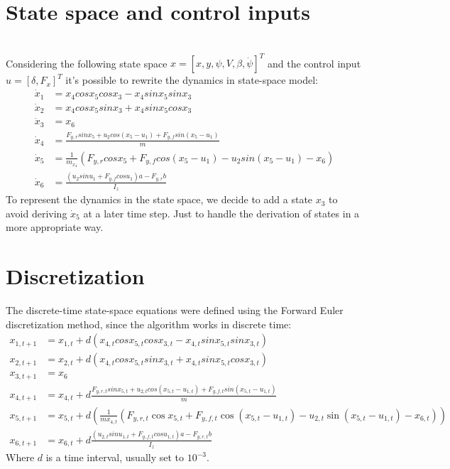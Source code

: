 \documentclass[a4paper,11pt,oneside]{book}
\begin{document}
\section{State space and control inputs}
\\Considering the following state space $x=[x,y,\psi,V,\beta,\dot\psi]^T$ and the control input $u=[\delta,F_x]^T$ it's possible to rewrite the dynamics in state-space model:
\begin{align*}
\dot x_1 &= x_4 cos x_5 cos x_3 - x_4 sin x_5 sin x_3 \\
\dot x_2 &= x_4 cos x_5 sin x_3 + x_4 sin x_5 cos x_3 \\
\dot x_3 &= x_6 \\
\dot x_4 &= \frac{F_{y,r} sin x_5+u_2 cos(x_5 - u_1) + F_{y,f} sin(x_5 - u_1)}{m}\\
\dot x_5 &= \frac{1}{m_x_4} (F_{y,r} cos x_5 + F_{y,f} cos (x_5-u_1)-u_2sin(x_5-u_1)-x_6)\\
\dot x_6&= \frac{(u_2 sin u_1 + F_{y,f} cos u_1) a - F_{y,r} b}{I_z}
\end{align*}
To represent the dynamics in the state space, we decide to add a state $x_3$ to avoid deriving $\dot x_5$
at a later time step.  Just to handle the derivation of states in a more appropriate way.

\section{Discretization}
The discrete-time state-space equations were defined using the Forward Euler discretization method, since the algorithm works in discrete time:
\begin{align*}
    x_{1,t+1} &= x_{1,t} + d(x_{4,t} cos x_{5,t} cos x_{3,t} - x_{4,t} sin x_{5,t} sin x_{3,t})\\
    x_{2,t+1} &= x_{2,t} + d(x_{4,t} cos x_{5,t} sin x_{3,t} + x_{4,t} sin x_{5,t} cos x_{3,t})\\
    x_{3,t+1} &= x_6\\
    x_{4,t+1} &= x_{4,t} + d\frac{F_{y,r,t} sin x_{5,t} + u_{2,t} cos(x_{5,t} - u_{1,t}) + F_{y,f,t} sin(x_{5,t} - u_{1,t})}{m}\\
    x_{5,t+1} &= x_{5,t} + d\left(\frac{1}{m x_{4, t}} \left(F_{y, r, t} \cos x_{5,t} + F_{y,f,t} \cos(x_{5,t} - u_{1,t}) - u_{2,t} \sin(x_{5,t} - u_{1,t}) - x_{6,t}\right)\right)\\
    x_{6,t+1} &= x_{6,t} + d\frac{(u_{2,t} sin u_{1,t} + F_{y,f,t} cos u_{1,t})a - F_{y,r,t} b}{I_z}
\end{align*}
Where $d$ is a time interval, usually set to $10^{-3}$.
\end{document}
